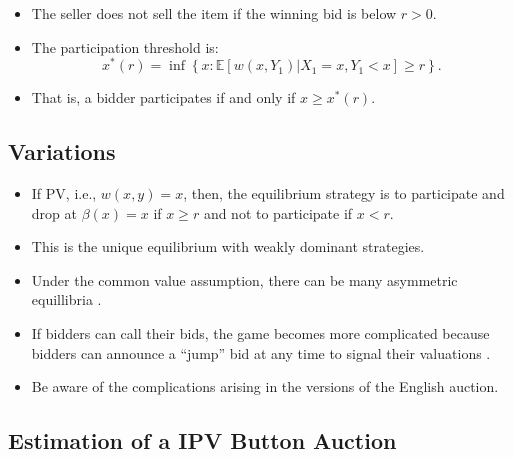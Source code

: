 \documentclass[
]{book}
\providecommand{\tightlist}{%
  \setlength{\itemsep}{0pt}\setlength{\parskip}{0pt}}
\begin{document}
\begin{itemize}
\tightlist
\item
  The seller does not sell the item if the winning bid is below \(r > 0\).
\item
  The participation threshold is:
  \[
  x^*(r) = \inf\left\{x: \mathbb{E}[w(x, Y_1)| X_1 = x, Y_1 < x] \ge r\right\}.
  \]
\item
  That is, a bidder participates if and only if \(x \ge x^*(r)\).
\end{itemize}

\hypertarget{variations}{%
\subsection{Variations}\label{variations}}

\begin{itemize}
\tightlist
\item
  If PV, i.e., \(w(x, y) = x\), then, the equilibrium strategy is to participate and drop at \(\beta(x) = x\) if \(x \ge r\) and not to participate if \(x < r\).
\item
  This is the unique equilibrium with weakly dominant strategies.
\item
  Under the common value assumption, there can be many asymmetric equillibria \citep{milgromRationalExpectationsInformation1981, bikhchandaniEquilibriaOpenCommon1991}.
\item
  If bidders can call their bids, the game becomes more complicated because bidders can announce a ``jump'' bid at any time to signal their valuations \citep{averyStrategicJumpBidding1998}.
\item
  Be aware of the complications arising in the versions of the English auction.
\end{itemize}

\hypertarget{estimation-of-a-ipv-button-auction}{%
\subsection{Estimation of a IPV Button Auction}\label{estimation-of-a-ipv-button-auction}}
\end{document}
